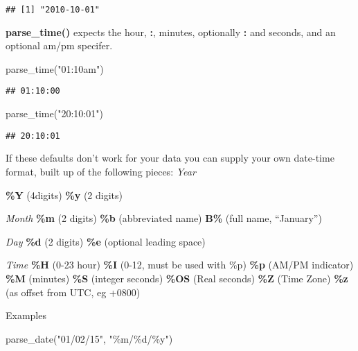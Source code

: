 \documentclass[
]{article}
\newenvironment{Shaded}{\begin{snugshade}}{\end{snugshade}}
\newcommand{\FunctionTok}[1]{\textcolor[rgb]{0.00,0.00,0.00}{#1}}
\newcommand{\NormalTok}[1]{#1}
\newcommand{\StringTok}[1]{\textcolor[rgb]{0.31,0.60,0.02}{#1}}
\begin{document}
\begin{verbatim}
## [1] "2010-10-01"
\end{verbatim}

\textbf{parse\_time()} expects the hour, \textbf{:}, minutes, optionally
\textbf{:} and seconds, and an optional am/pm specifer.

\begin{Shaded}
\begin{Highlighting}[]
\FunctionTok{parse\_time}\NormalTok{(}\StringTok{"01:10am"}\NormalTok{)}
\end{Highlighting}
\end{Shaded}

\begin{verbatim}
## 01:10:00
\end{verbatim}

\begin{Shaded}
\begin{Highlighting}[]
\FunctionTok{parse\_time}\NormalTok{(}\StringTok{"20:10:01"}\NormalTok{)}
\end{Highlighting}
\end{Shaded}

\begin{verbatim}
## 20:10:01
\end{verbatim}

If these defaults don't work for your data you can supply your own
date-time format, built up of the following pieces: \emph{Year}

\textbf{\%Y} (4digits) \textbf{\%y} (2 digits)

\emph{Month} \textbf{\%m} (2 digits) \textbf{\%b} (abbreviated name)
\textbf{B\%} (full name, ``January'')

\emph{Day} \textbf{\%d} (2 digits) \textbf{\%e} (optional leading space)

\emph{Time} \textbf{\%H} (0-23 hour) \textbf{\%I} (0-12, must be used
with \%p) \textbf{\%p} (AM/PM indicator) \textbf{\%M} (minutes)
\textbf{\%S} (integer seconds) \textbf{\%OS} (Real seconds) \textbf{\%Z}
(Time Zone) \textbf{\%z} (as offset from UTC, eg +0800)

Examples

\begin{Shaded}
\begin{Highlighting}[]
\FunctionTok{parse\_date}\NormalTok{(}\StringTok{"01/02/15"}\NormalTok{, }\StringTok{"\%m/\%d/\%y"}\NormalTok{)}
\end{Highlighting}
\end{Shaded}
\end{document}
